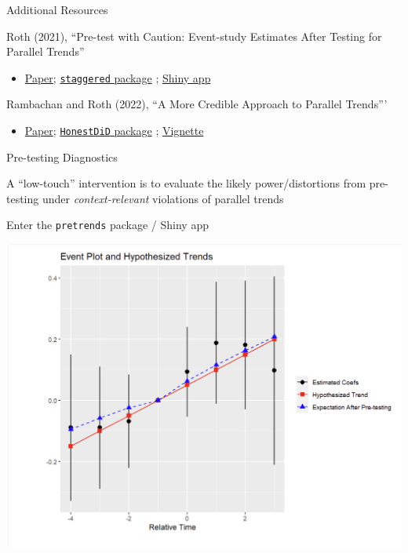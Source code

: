 \documentclass[aspectratio = 169, 13pt]{beamer}
\begin{document}
\begin{frame}{Additional Resources}
	\begin{wideitemize}
		\item
		Roth (2021), ``Pre-test with Caution: Event-study Estimates After Testing for Parallel Trends''
		\begin{itemize}
			\item 
			      \href{https://jonathandroth.github.io/assets/files/roth_pretrends_testing.pdf}{Paper}; \href{https://github.com/jonathandroth/pretrends}{\texttt{staggered} package} ; \href{https://github.com/jonathandroth/PretrendsPower\#pretrendspower}{Shiny app}
		\end{itemize}
		    
		\item
		Rambachan and Roth (2022), ``A More Credible Approach to Parallel Trends'''
		\begin{itemize}
			\item 
			      \href{https://jonathandroth.github.io/assets/files/HonestParallelTrends_Main.pdf}{Paper}; \href{https://github.com/asheshrambachan/HonestDiD}{\texttt{HonestDiD} package} ; \href{https://github.com/asheshrambachan/HonestDiD/blob/master/doc/HonestDiD_Example.pdf}{Vignette}
		\end{itemize}
	\end{wideitemize}
\end{frame}

\begin{frame}[label = power_analysis]{Pre-testing Diagnostics}
	\begin{wideitemize}
		\item
		A ``low-touch'' intervention is to evaluate the likely power/distortions from pre-testing under \textit{context-relevant} violations of parallel trends
		
		\item Enter the \texttt{pretrends} package / Shiny app
	\end{wideitemize}
\end{frame}

\begin{frame}
	\centering
	\includegraphics[height = 0.9 \textheight]{figures/Shiny-Mockup-Graph-Only.png}   
\end{frame}
\end{document}
